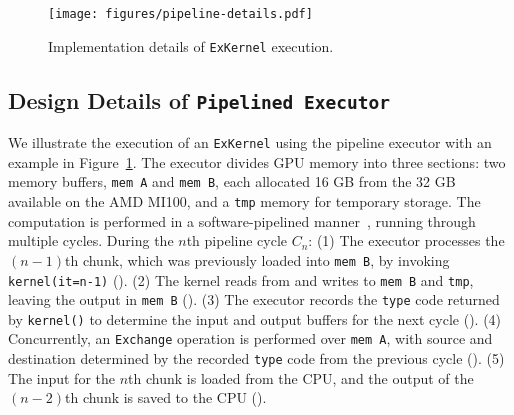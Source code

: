 \begin{comment}
\texttt{kernel()} wraps the on-GPU kernels that are only designed to process data on GPU memory.
It provides the wrapped kernels with a piece of \texttt{mem} memory holding input and output, a \texttt{type} code indicating \texttt{mem}'s layout, and an index \texttt{it} to the chunk of data currently being processed.
A \texttt{tmp} memory is also provided to hold execution temporaries.
The layout of \texttt{mem} is determined by methods \texttt{inBuffer()} and \texttt{outBuffer()}.
Based on the \texttt{type} code and the index \texttt{it}, they return a part of \texttt{mem} to hold input and another for output.
After \texttt{kernel()} finishes, it returns a \texttt{type} code that can be passed to \texttt{outBuffer()} to locate the output, as well as passed to \texttt{inBuffer()} to load next input.
\end{comment}


\begin{figure}[t]
    \centering
    \texttt{[image: figures/pipeline-details.pdf]}
    \caption{Implementation details of \texttt{ExKernel} execution.}
    \label{fig:pipeline-details}
\end{figure}

\subsection{\textbf{Design Details of \texttt{Pipelined Executor}}}
\label{sec:executor}
We illustrate the execution of an \texttt{ExKernel} using the pipeline executor with an example in Figure~\ref{fig:pipeline-details}.
The executor divides GPU memory into three sections: two memory buffers, \texttt{mem A} and \texttt{mem B}, each allocated 16 GB from the 32 GB available on the AMD MI100, and a \texttt{tmp} memory for temporary storage.
The computation is performed in a software-pipelined manner~\cite{softpipe-pldi-1988}, running through multiple cycles. 
During the $n$th pipeline cycle $C_n$:
(1) The executor processes the $(n-1)$th chunk, which was previously loaded into \texttt{mem B}, by invoking \texttt{kernel(it=n-1)} ().
(2) The kernel reads from and writes to \texttt{mem B} and \texttt{tmp}, leaving the output in \texttt{mem B} ().
(3) The executor records the \texttt{type} code returned by \texttt{kernel()} to determine the input and output buffers for the next cycle ().
(4) Concurrently, an \texttt{Exchange} operation is performed over \texttt{mem A}, with source and destination determined by the recorded \texttt{type} code from the previous cycle ().
(5) The input for the $n$th chunk is loaded from the CPU, and the output of the $(n - 2)$th chunk is saved to the CPU ().

